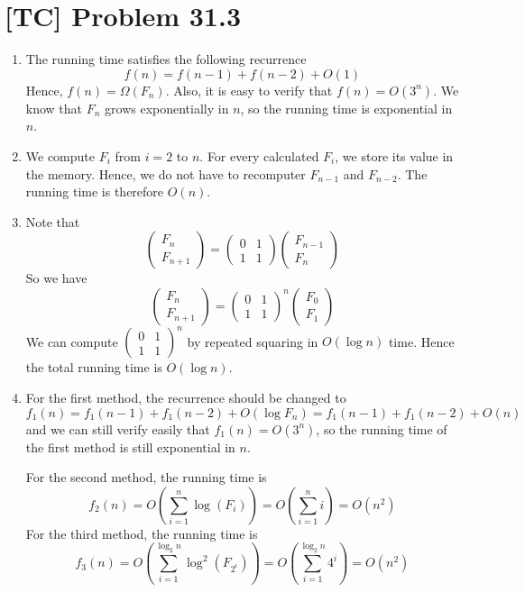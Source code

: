 \documentclass[a4paper,11pt]{article}
\begin{document}
  \section{[TC] Problem 31.3}
  \begin{enumerate}
    \item The running time satisfies the following recurrence
    $$ f(n) = f(n-1) + f(n-2) + O(1) $$
    Hence, $f(n) = \Omega(F_n)$. Also, it is easy to verify that $f(n) = O(3^n)$. We know that $F_n$ grows exponentially in $n$, so the running time is exponential in $n$.
    \item We compute $F_i$ from $i = 2$ to $n$. For every calculated $F_i$, we store its value in the memory. Hence, we do not have to recomputer $F_{n-1}$ and $F_{n-2}$. The running time is therefore $O(n)$.
    \item Note that
    \begin{equation*}
      \begin{pmatrix} F_n \\ F_{n+1} \end{pmatrix} =
      \begin{pmatrix} 0 & 1 \\ 1 & 1 \end{pmatrix} \begin{pmatrix} F_{n-1} \\ F_{n} \end{pmatrix}
    \end{equation*}
    So we have
    \begin{equation*}
      \begin{pmatrix} F_n \\ F_{n+1} \end{pmatrix} =
      \begin{pmatrix} 0 & 1 \\ 1 & 1 \end{pmatrix}^n \begin{pmatrix} F_{0} \\ F_{1} \end{pmatrix}
    \end{equation*}
    We can compute $\begin{pmatrix} 0 & 1 \\ 1 & 1 \end{pmatrix}^n $ by repeated squaring in $O(\log n)$ time. Hence the total running time is $O(\log n)$.
    \item For the first method, the recurrence should be changed to
    $$ f_1(n) = f_1(n-1) + f_1(n-2) + O(\log F_n) = f_1(n-1) + f_1(n-2) + O(n) $$
    and we can still verify easily that $f_1(n) = O(3^n)$, so the running time of the first method is still exponential in $n$. \par
    For the second method, the running time is 
    $$ f_2(n) = O(\sum_{i = 1}^{n} \log(F_i)) = O(\sum_{i = 1}^n i) = O(n^2) $$ 
    For the third method, the running time is
    $$ f_3(n) = O(\sum_{i = 1}^{\log_2 n} \log^2(F_{2^i})) = O(\sum_{i = 1}^{\log_2 n} 4^i) = O(n^2) $$
  \end{enumerate}
\end{document}
